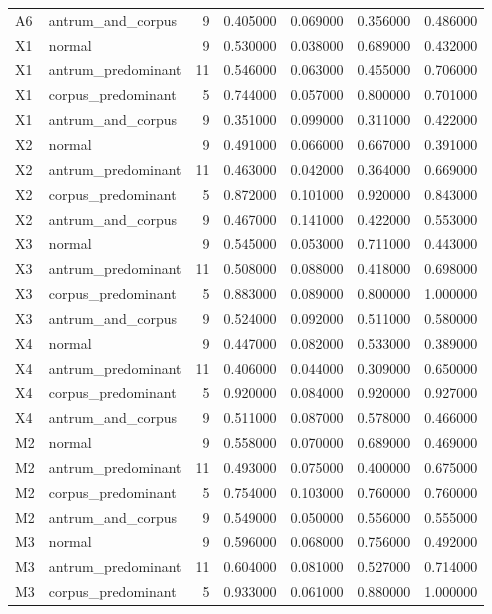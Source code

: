 \begin{table}
\begin{tabular}{llrrrrr}
A6 & antrum\_and\_corpus & 9 & 0.405000 & 0.069000 & 0.356000 & 0.486000 \\
X1 & normal & 9 & 0.530000 & 0.038000 & 0.689000 & 0.432000 \\
X1 & antrum\_predominant & 11 & 0.546000 & 0.063000 & 0.455000 & 0.706000 \\
X1 & corpus\_predominant & 5 & 0.744000 & 0.057000 & 0.800000 & 0.701000 \\
X1 & antrum\_and\_corpus & 9 & 0.351000 & 0.099000 & 0.311000 & 0.422000 \\
X2 & normal & 9 & 0.491000 & 0.066000 & 0.667000 & 0.391000 \\
X2 & antrum\_predominant & 11 & 0.463000 & 0.042000 & 0.364000 & 0.669000 \\
X2 & corpus\_predominant & 5 & 0.872000 & 0.101000 & 0.920000 & 0.843000 \\
X2 & antrum\_and\_corpus & 9 & 0.467000 & 0.141000 & 0.422000 & 0.553000 \\
X3 & normal & 9 & 0.545000 & 0.053000 & 0.711000 & 0.443000 \\
X3 & antrum\_predominant & 11 & 0.508000 & 0.088000 & 0.418000 & 0.698000 \\
X3 & corpus\_predominant & 5 & 0.883000 & 0.089000 & 0.800000 & 1.000000 \\
X3 & antrum\_and\_corpus & 9 & 0.524000 & 0.092000 & 0.511000 & 0.580000 \\
X4 & normal & 9 & 0.447000 & 0.082000 & 0.533000 & 0.389000 \\
X4 & antrum\_predominant & 11 & 0.406000 & 0.044000 & 0.309000 & 0.650000 \\
X4 & corpus\_predominant & 5 & 0.920000 & 0.084000 & 0.920000 & 0.927000 \\
X4 & antrum\_and\_corpus & 9 & 0.511000 & 0.087000 & 0.578000 & 0.466000 \\
M2 & normal & 9 & 0.558000 & 0.070000 & 0.689000 & 0.469000 \\
M2 & antrum\_predominant & 11 & 0.493000 & 0.075000 & 0.400000 & 0.675000 \\
M2 & corpus\_predominant & 5 & 0.754000 & 0.103000 & 0.760000 & 0.760000 \\
M2 & antrum\_and\_corpus & 9 & 0.549000 & 0.050000 & 0.556000 & 0.555000 \\
M3 & normal & 9 & 0.596000 & 0.068000 & 0.756000 & 0.492000 \\
M3 & antrum\_predominant & 11 & 0.604000 & 0.081000 & 0.527000 & 0.714000 \\
M3 & corpus\_predominant & 5 & 0.933000 & 0.061000 & 0.880000 & 1.000000 \\

\end{tabular}
\end{table}
